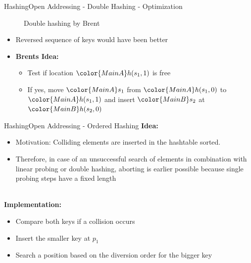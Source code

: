 
\begin{frame}{Hashing}{Open Addressing - Double Hashing - Optimization}
  \vspace{-2.0em}
  \begin{figure}[!h]
    \begin{adjustbox}{width=0.9\linewidth}%
    \end{adjustbox}
    \vspace{-1.0em}
    \caption{Double hashing by Brent}%
    \label{fig:hashing:open_addressing:double_hashing_brent}%
  \end{figure}
  \vspace{-1.0em}
  \begin{itemize}
  \item<4->
    Reversed sequence of keys would have been better
  \item<5->
    \textbf{Brents Idea:}
    \begin{itemize}
    \item<6->
      Test if location ${\color{MainA}h(s_1, 1)}$ is free
    \item<7->
      If yes, move ${\color{MainA}s_1}$ from
      ${\color{MainA}h(s_1, 0)}$ to ${\color{MainA}h(s_1, 1)}$
      and insert ${\color{MainB}s_2}$ at
      ${\color{MainB}h(s_2, 0)}$
    \end{itemize}
  \end{itemize}  
\end{frame}


\begin{frame}{Hashing}{Open Addressing - Ordered Hashing}
  \textbf{ Idea:}
  \begin{itemize}
    \item Motivation:
      Colliding elements are inserted in the hashtable sorted. 
    \item
      Therefore, in case of an unsuccessful search of elements
      in combination with linear probing or double hashing,
      aborting is earlier possible because single probing steps
      have a fixed length
  \end{itemize}
  \hfill\\[0.5em]
  \textbf{Implementation:}
  \begin{itemize}
    \item
      Compare both keys if a collision occurs
    \item
      Insert the smaller key at $p_1$
    \item
      Search a position based on the diversion order for the bigger key
  \end{itemize}
\end{frame}

